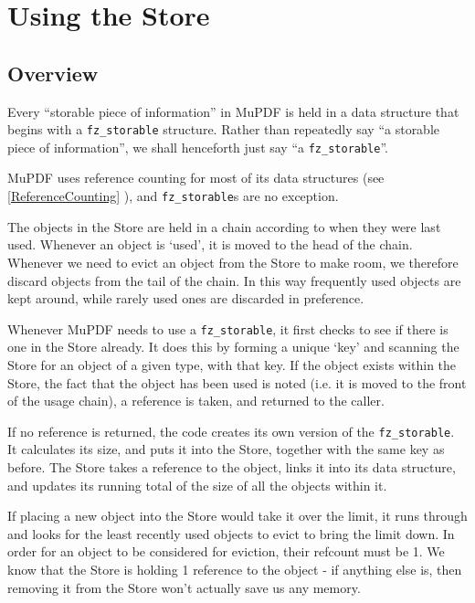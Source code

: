 \documentclass[oneside]{book}
\newcommand{\rjwref}[1] {\autoref{#1} \nameref{#1}}
\begin{document}
\section{Using the Store}

\subsection{Overview}

Every ``storable piece of information'' in MuPDF is held in a data structure that begins with a \texttt{fz\_storable} structure. Rather than repeatedly say ``a storable piece of information'', we shall henceforth just say ``a \texttt{fz\_storable}''.

MuPDF uses reference counting for most of its data structures (see \rjwref{ReferenceCounting}), and \texttt{fz\_storable}s are no exception.

The objects in the Store are held in a chain according to when they were last used. Whenever an object is `used', it is moved to the head of the chain. Whenever we need to evict an object from the Store to make room, we therefore discard objects from the tail of the chain. In this way frequently used objects are kept around, while rarely used ones are discarded in preference.

Whenever MuPDF needs to use a \texttt{fz\_storable}, it first checks to see if there is one in the Store already. It does this by forming a unique `key' and scanning the Store for an object of a given type, with that key. If the object exists within the Store, the fact that the object has been used is noted (i.e. it is moved to the front of the usage chain), a reference is taken, and returned to the caller.

If no reference is returned, the code creates its own version of the \texttt{fz\_storable}. It calculates its size, and puts it into the Store, together with the same key as before. The Store takes a reference to the object, links it into its data structure, and updates its running total of the size of all the objects within it.

If placing a new object into the Store would take it over the limit, it runs through and looks for the least recently used objects to evict to bring the limit down. In order for an object to be considered for eviction, their refcount must be 1. We know that the Store is holding 1 reference to the object - if anything else is, then removing it from the Store won't actually save us any memory.
\end{document}

